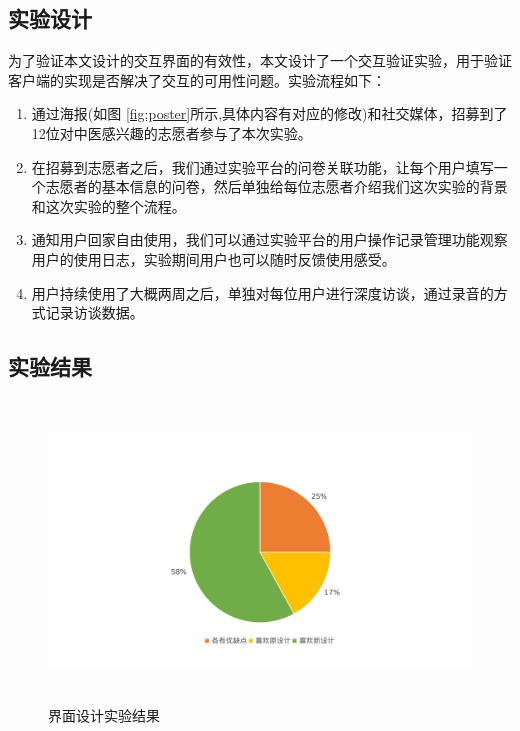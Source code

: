 \subsection{实验设计}
为了验证本文设计的交互界面的有效性，本文设计了一个交互验证实验，用于验证客户端的实现是否解决了交互的可用性问题。实验流程如下：
\begin{enumerate}


    \item 通过海报(如图 \ref{fig:poster}所示,具体内容有对应的修改)和社交媒体，招募到了12位对中医感兴趣的志愿者参与了本次实验。

    \item 在招募到志愿者之后，我们通过实验平台的问卷关联功能，让每个用户填写一个志愿者的基本信息的问卷，然后单独给每位志愿者介绍我们这次实验的背景和这次实验的整个流程。

    \item 通知用户回家自由使用，我们可以通过实验平台的用户操作记录管理功能观察用户的使用日志，实验期间用户也可以随时反馈使用感受。

    \item 用户持续使用了大概两周之后，单独对每位用户进行深度访谈，通过录音的方式记录访谈数据。

\end{enumerate}

\subsection{实验结果}


\begin{figure}[ht]
    \centering
    \includegraphics[height=8cm]{images/ui-exp.pdf}
    \caption{界面设计实验结果}
    \label{fig:ui-exp}
\end{figure}

